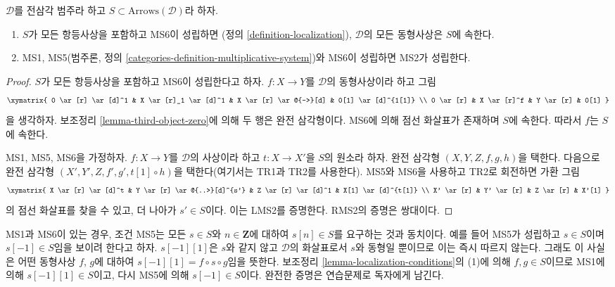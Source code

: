 \begin{lemma}
\label{lemma-localization-conditions}
$\mathcal{D}$를 전삼각 범주라 하고
$S \subset \text{Arrows}(\mathcal{D})$라 하자.
\begin{enumerate}
\item $S$가 모든 항등사상을 포함하고 MS6이 성립하면
(정의 \ref{definition-localization}), $\mathcal{D}$의 모든
동형사상은 $S$에 속한다.
\item MS1, MS5(범주론, 정의
\ref{categories-definition-multiplicative-system})와 MS6이 성립하면
MS2가 성립한다.
\end{enumerate}
\end{lemma}

\begin{proof}
$S$가 모든 항등사상을 포함하고 MS6이 성립한다고 하자.
$f : X \to Y$를 $\mathcal{D}$의 동형사상이라 하고 그림
$$
\xymatrix{
0 \ar[r] \ar[d]^1 &
X \ar[r]_1 \ar[d]^1 &
X \ar[r] \ar@{-->}[d] &
0[1] \ar[d]^{1[1]} \\
0 \ar[r] &
X \ar[r]^f &
Y \ar[r] &
0[1]
}
$$
을 생각하자. 보조정리 \ref{lemma-third-object-zero}에 의해 두 행은
완전 삼각형이다. MS6에 의해 점선 화살표가 존재하며 $S$에 속한다.
따라서 $f$는 $S$에 속한다.

\medskip\noindent
MS1, MS5, MS6을 가정하자. $f : X \to Y$를 $\mathcal{D}$의 사상이라
하고 $t : X \to X'$을 $S$의 원소라 하자. 완전 삼각형
$(X, Y, Z, f, g, h)$을 택한다. 다음으로 완전 삼각형
$(X', Y', Z, f', g', t[1] \circ h)$을 택한다(여기서는 TR1과 TR2를
사용한다). MS5와 MS6을 사용하고 TR2로 회전하면 가환 그림
$$
\xymatrix{
X \ar[r] \ar[d]^t &
Y \ar[r] \ar@{..>}[d]^{s'} &
Z \ar[r] \ar[d]^1 &
X[1] \ar[d]^{t[1]} \\
X' \ar[r] &
Y' \ar[r] &
Z \ar[r] &
X'[1]
}
$$
의 점선 화살표를 찾을 수 있고, 더 나아가 $s' \in S$이다.
이는 LMS2를 증명한다. RMS2의 증명은 쌍대이다.
\end{proof}

\begin{remark}
\label{remark-MS5}
MS1과 MS6이 있는 경우, 조건 MS5는 모든 $s \in S$와
$n \in \mathbf{Z}$에 대하여 $s[n] \in S$를 요구하는 것과 동치이다.
예를 들어 MS5가 성립하고 $s \in S$이며 $s[-1] \in S$임을 보이려 한다고
하자. $s[-1][1]$은 $s$와 같지 않고 $\mathcal{D}$의 화살표로서
$s$와 동형일 뿐이므로 이는 즉시 따르지 않는다. 그래도 이 사실은 어떤
동형사상 $f$, $g$에 대하여 $s[-1][1] = f \circ s \circ g$임을 뜻한다.
보조정리 \ref{lemma-localization-conditions}의 (1)에 의해
$f, g \in S$이므로 MS1에 의해 $s[-1][1] \in S$이고, 다시 MS5에 의해
$s[-1] \in S$이다. 완전한 증명은 연습문제로 독자에게 남긴다.
\end{remark}

